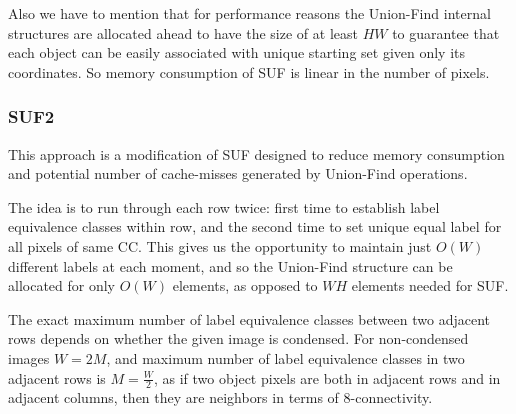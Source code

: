 \documentclass[hidelinks]{llncs}
\newcommand{\texten}[1]{#1}
\newcommand{\textru}[1]{}
\begin{document}
\texten{
Also we have to mention that for performance reasons the Union-Find internal structures
are allocated ahead to have the size of at least $HW$ to guarantee that
each object can be easily associated with unique starting set given only its
coordinates. So memory consumption of SUF is linear in the number of pixels.
}\textru{
Также необходимо отметить, что для лучшей производительности служебные массивы
структуры Union-Find заранее выделяются размера как минимум $HW$, чтобы
обеспечить простоту соответствия между пикселями изображения и элементами в
системе множеств.
Таким образом, SUF использует линейное от числа пикселей количество памяти
$O(HW)$.
}

\subsubsection{SUF2}

\texten{
This approach is a modification of SUF designed to reduce memory consumption
and potential number of cache-misses generated by Union-Find operations.
}\textru{
Этот подход~--- модификация SUF, предложенная, чтобы сократить потребление
памяти и предположительно сильно уменьшить число кэш-промахов, происходящих
из-за произвольного доступа к большим массивам структуры Union-Find.
}

\texten{
The idea is to run through each row twice: first time to establish label equivalence
classes within row, and the second time to set unique equal label for all pixels of
same CC.
This gives us the opportunity to maintain just $O(W)$
different labels at each moment, and so the Union-Find structure can be allocated
for only $O(W)$ elements, as opposed to $WH$ elements needed for SUF.
}\textru{
Идея в том, чтобы бежать по каждой строке дважды: один раз чтобы установить
классы эквивалентности меток в текущей и предыдущей строках, и второй раз, чтобы
расставить уникальные метки в пиксели каждого класса.
Это даёт нам возможность иметь не более $O(W)$ различных меток в каждый момент
времени, и поэтому Union-Find можно выделять размера всего $O(W)$, при том что в
SUF выделялось ровно $WH$ элементов.
}

\texten{
The exact maximum number of label equivalence classes between two adjacent rows
depends on whether the given image is condensed.
For non-condensed images $W=2M$, and maximum number of label equivalence classes
in two adjacent rows is $M=\frac{W}2$, as if two object pixels are both in adjacent
rows and in adjacent columns, then they are neighbors in terms of 8-connectivity.
}\textru{
Точная оценка на максимальное число классов эквивалентности меток в двух
соседних строках зависит от того, сжатое изображение поступило на вход, или нет.
Для несжатых изображений $W=2M$, и наибольшее число классов эквивалентности в
соседних строках равно $M=\frac{W}2$, так как если два объектных пикселя
находятся одновременно в соседних строках и соседних столбцах, то они соседи в
смысле 8-связности.
}
\end{document}
